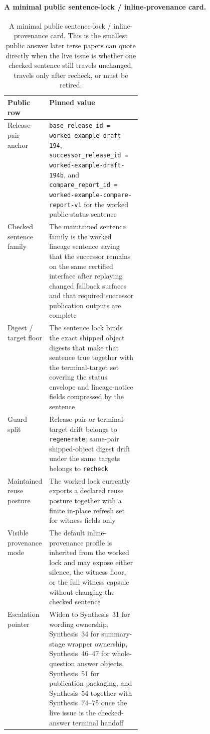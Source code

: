 \documentclass[11pt]{article}
\begin{document}
\paragraph{A minimal public sentence-lock / inline-provenance card.}
\begin{table}[t]
\centering
\small
\begin{tabularx}{0.97\linewidth}{@{}p{0.31\linewidth}X@{}}
\toprule
\textbf{Public row} & \textbf{Pinned value}\\
\midrule
Release-pair anchor & \texttt{base\_release\_id = worked-example-draft-194}, \texttt{successor\_release\_id = worked-example-draft-194b}, and \texttt{compare\_report\_id = worked-example-compare-report-v1} for the worked public-status sentence \\
Checked sentence family & The maintained sentence family is the worked lineage sentence saying that the successor remains on the same certified interface after replaying changed fallback surfaces and that required successor publication outputs are complete \\
Digest / target floor & The sentence lock binds the exact shipped object digests that make that sentence true together with the terminal-target set covering the status envelope and lineage-notice fields compressed by the sentence \\
Guard split & Release-pair or terminal-target drift belongs to \texttt{regenerate}; same-pair shipped-object digest drift under the same targets belongs to \texttt{recheck} \\
Maintained reuse posture & The worked lock currently exports a declared reuse posture together with a finite in-place refresh set for witness fields only \\
Visible provenance mode & The default inline-provenance profile is inherited from the worked lock and may expose either silence, the witness floor, or the full witness capsule without changing the checked sentence \\
Escalation pointer & Widen to Synthesis~31 for wording ownership, Synthesis~34 for summary-stage wrapper ownership, Synthesis~46--47 for whole-question answer objects, Synthesis~51 for publication packaging, and Synthesis~54 together with Synthesis~74--75 once the live issue is the checked-answer terminal handoff \\
\bottomrule
\end{tabularx}
\caption{A minimal public sentence-lock / inline-provenance card. This is the smallest public answer later terse papers can quote directly when the live issue is whether one checked sentence still travels unchanged, travels only after recheck, or must be retired.}
\label{tab:minimal-sentence-lock-card}
\end{table}
\end{document}
